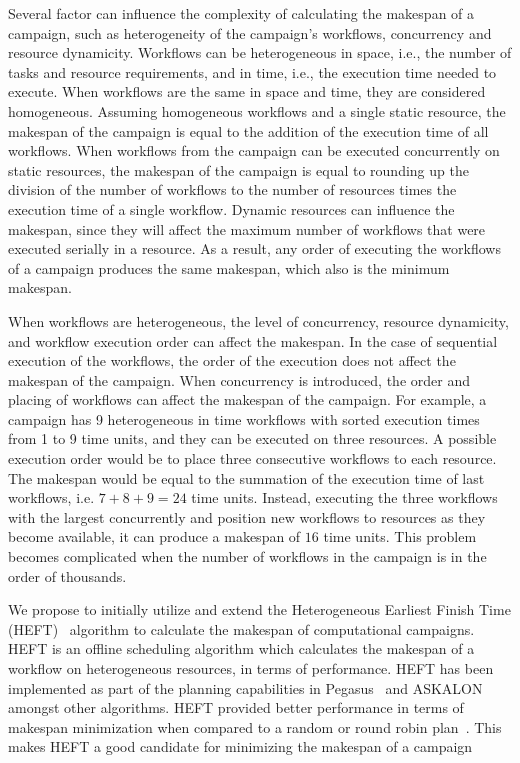 Several factor can influence the complexity of calculating the makespan of a campaign, such as heterogeneity of the campaign's workflows, concurrency and resource dynamicity.
Workflows can be heterogeneous in space, i.e., the number of tasks and resource requirements, and in time, i.e., the execution time needed to execute.
When workflows are the same in space and time, they are considered homogeneous.
Assuming homogeneous workflows and a single static resource, the makespan of the campaign is equal to the addition of the execution time of all workflows.
When workflows from the campaign can be executed concurrently on static resources, the makespan of the campaign is equal to rounding up the division of the number of workflows to the number of resources times the execution time of a single workflow.
Dynamic resources can influence the makespan, since they will affect the maximum number of workflows that were executed serially in a resource.
As a result, any order of executing the workflows of a campaign produces the same makespan, which also is the minimum makespan.

When workflows are heterogeneous, the level of concurrency, resource dynamicity, and workflow execution order can affect the makespan.
In the case of sequential execution of the workflows, the order of the execution does not affect the makespan of the campaign.
When concurrency is introduced, the order and placing of workflows can affect the makespan of the campaign.
For example, a campaign has 9 heterogeneous in time workflows with sorted execution times from 1 to 9 time units, and they can be executed on three resources.
A possible execution order would be to place three consecutive workflows to each resource.
The makespan would be equal to the summation of the execution time of last workflows, i.e. $7 + 8 + 9 = 24$ time units.
Instead, executing the three workflows with the largest concurrently and position new workflows to resources as they become available, it can produce a makespan of $16$ time units.
This problem becomes complicated when the number of workflows in the campaign is in the order of thousands.



We propose to initially utilize and extend the Heterogeneous Earliest Finish Time (HEFT)~\cite{topcuoglu2002performance} algorithm to calculate the makespan of computational campaigns.
HEFT is an offline scheduling algorithm which calculates the makespan of a workflow on heterogeneous resources, in terms of performance.
HEFT has been implemented as part of the planning capabilities in Pegasus~\cite{deelman2015pegasus} and ASKALON~\cite{fahringer2005askalon} amongst other algorithms.
HEFT provided better performance in terms of makespan minimization when compared to a random or round robin plan~\cite{deelman2015pegasus}.
This makes HEFT a good candidate for minimizing the makespan of a campaign


